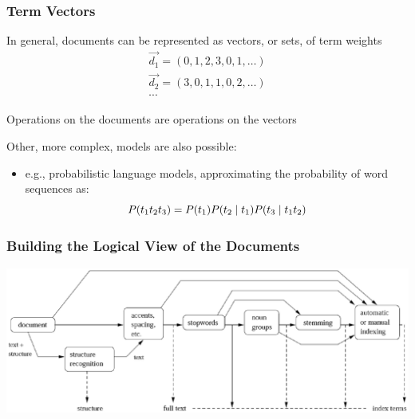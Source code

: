\documentclass[svgnames]{beamer}
\begin{document}

\begin{frame}
    \frametitle{Term Vectors}

    \begin{block}{}
        In general, documents can be represented as vectors, or sets, of term
        weights
        \begin{displaymath}
            \begin{array}{ll}
              \vec{d_1} = ( 0, 1, 2, 3, 0, 1, \ldots ) \\
              \vec{d_2} = ( 3, 0, 1, 1, 0, 2, \ldots ) \\
              \cdots
            \end{array}
        \end{displaymath}

        Operations on the documents are operations on the vectors
        
    \end{block}

    \begin{block}{}
        Other, more complex, models are also possible:
        \begin{itemize}
        \item e.g., probabilistic language models, approximating the probability of word sequences as:
            \begin{displaymath}\footnotesize
                P(t_{1}t_{2}t_{3})=P(t_{1})P(t_{2}\mid t_{1})P(t_{3}\mid t_{1}t_{2})
            \end{displaymath}
        \end{itemize}
    \end{block}


\end{frame}


\begin{frame}
    \frametitle{Building the Logical View of the Documents}

    \begin{block}{}
        \includegraphics[width=\textwidth]{logical}
    \end{block}  
    
\end{frame}
\end{document}
